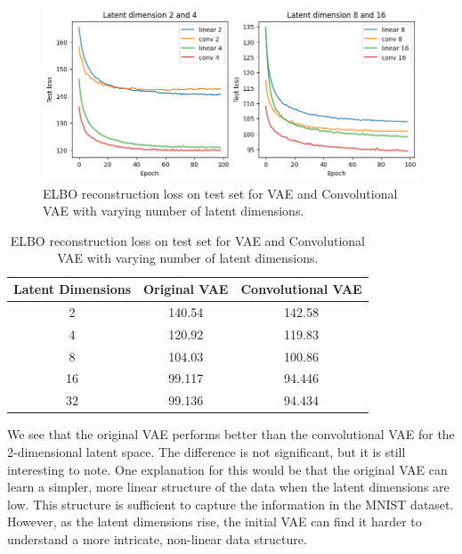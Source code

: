\begin{figure}[H]
\centering
\includegraphics[width=\textwidth]{images/test_loss.png}
\caption{ELBO reconstruction loss on test set for VAE and Convolutional VAE with varying number of latent dimensions.}
\label{fig:vaeloss}
\end{figure}

\begin{table}
\centering
\begin{tabular}{|c|c|c|}
\hline
\multicolumn{1}{|c|}{\textbf{Latent Dimensions}} & \multicolumn{1}{c|}{\textbf{Original VAE}} & \multicolumn{1}{c|}{\textbf{Convolutional VAE}} \\ \hline
\multicolumn{1}{|c|}{2} & \multicolumn{1}{c|}{140.54} & \multicolumn{1}{c|}{142.58}  \\ \hline
\multicolumn{1}{|c|}{4} & \multicolumn{1}{c|}{120.92} & \multicolumn{1}{c|}{119.83}  \\ \hline
\multicolumn{1}{|c|}{8} & \multicolumn{1}{c|}{104.03} & \multicolumn{1}{c|}{100.86}  \\ \hline
\multicolumn{1}{|c|}{16} & \multicolumn{1}{c|}{99.117} & \multicolumn{1}{c|}{94.446}  \\ \hline
\multicolumn{1}{|c|}{32} & \multicolumn{1}{c|}{99.136} & \multicolumn{1}{c|}{94.434}  \\ \hline
\end{tabular}
\vspace*{0.5cm}
\caption{ELBO reconstruction loss on test set for VAE and Convolutional VAE with varying number of latent dimensions.}
\label{tab:vaeloss}
\end{table}

We see that the original VAE performs better than the convolutional VAE for the 2-dimensional latent space. The difference is not significant, but it is still interesting to note. One explanation for this would be that the original VAE can learn a simpler, more linear structure of the data when the latent dimensions are low. This structure is sufficient to capture the information in the MNIST dataset. However, as the latent dimensions rise, the initial VAE can find it harder to understand a more intricate, non-linear data structure.

